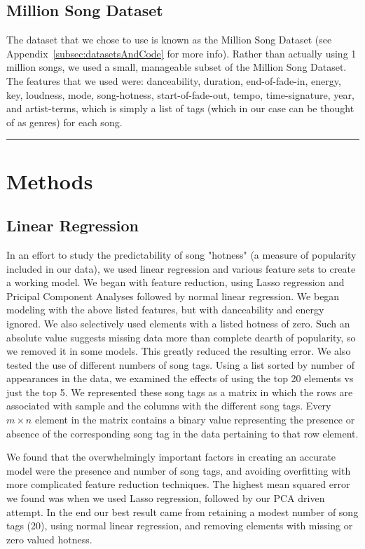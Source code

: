 \documentclass[12pt]{article}
\newcommand{\horizontalLine}{
	\begin{center}
		\hrule width 1.0\textwidth
	\end{center}
}
\begin{document}
\subsection{Million Song Dataset}
\label{subsec:datasetIntro}
The dataset that we chose to use is known as the Million Song Dataset (see Appendix~\ref{subsec:datasetsAndCode} for more info). Rather than actually using 1 million songs, we used a small, manageable subset of the Million Song Dataset. The features that we used were: danceability, duration, end-of-fade-in, energy, key, loudness, mode, song-hotness, start-of-fade-out, tempo, time-signature, year, and artist-terms, which is simply a list of tags (which in our case can be thought of as genres) for each song.
\horizontalLine
\section{Methods}
\label{sec:methods}
\subsection{Linear Regression}
\label{subsec:linearRegression}
In an effort to study the predictability of song "hotness" (a measure of popularity included in our data), we used linear regression and various feature sets to create a working model. We began with feature reduction, using Lasso regression and Pricipal Component Analyses followed by normal linear regression. We began modeling with the above listed features, but with danceability and energy ignored. We also selectively used elements with a listed hotness of zero. Such an absolute value suggests missing data more than complete dearth of popularity, so we removed it in some models. This greatly reduced the resulting error. We also tested the use of different numbers of song tags. Using a list sorted by number of appearances in the data, we examined the effects of using the top 20 elements vs just the top 5. We represented these song tags as a matrix in which the rows are associated with sample and the columns with the different song tags. Every $m \times n$ element in the matrix contains a binary value representing the presence or absence of the corresponding song tag in the data pertaining to that row element.

We found that the overwhelmingly important factors in creating an accurate model were the presence and number of song tags, and avoiding overfitting with more complicated feature reduction techniques. The highest mean squared error we found was when we used Lasso regression, followed by our PCA driven attempt. In the end our best result came from retaining a modest number of song tags (20), using normal linear regression, and removing elements with missing or zero valued hotness.
\end{document}
